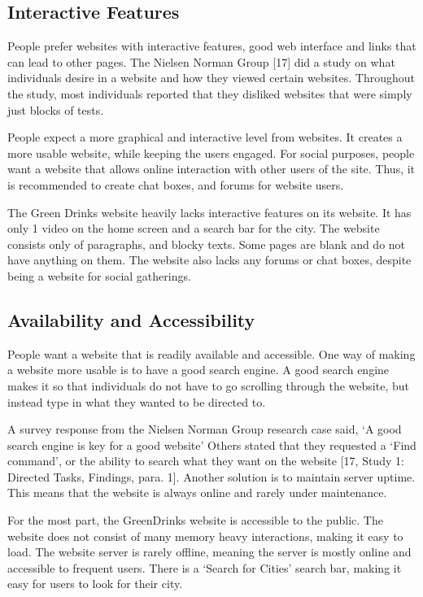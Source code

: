 \documentclass[12pt]{article}
\begin{document}
\subsection*{Interactive Features}
People prefer websites with interactive features, good web interface and links that can lead to other pages. The Nielsen Norman Group [17] did a study on what individuals desire in a website and how they viewed certain websites. Throughout the study, most individuals reported that they disliked websites that were simply just blocks of tests. 

People expect a more graphical and interactive level from websites. It creates a more usable website, while keeping the users engaged. For social purposes, people want a website that allows online interaction with other users of the site. Thus, it is recommended to create chat boxes, and forums for website users.

The Green Drinks website heavily lacks interactive features on its website. It has only 1 video on the home screen and a search bar for the city. The website consists only of paragraphs, and blocky texts. Some pages are blank and do not have anything on them. The website also lacks any forums or chat boxes, despite being a website for social gatherings.

\subsection*{Availability and Accessibility}
People want a website that is readily available and accessible. One way of making a website more usable is to have a good search engine. A good search engine makes it so that individuals do not have to go scrolling through the website, but instead type in what they wanted to be directed to. 

A survey response from the Nielsen Norman Group research case said, ‘A good search engine is key for a good website’ Others stated that they requested a ‘Find command’,  or the ability to search what they want on the website [17, Study 1: Directed Tasks, Findings, para. 1]. Another solution is to maintain server uptime. This means that the website is always online and rarely under maintenance.

For the most part, the GreenDrinks website is accessible to the public. The website does not consist of many memory heavy interactions, making it easy to load. The website server is rarely offline, meaning the server is mostly online and accessible to frequent users. There is a ‘Search for Cities’ search bar, making it easy for users to look for their city.
\end{document}
